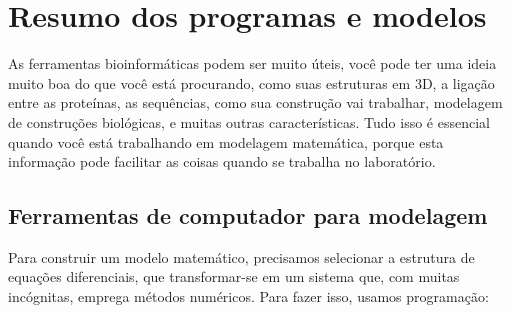 \documentclass[11pt, letterpaper, portuguese]{article}
\begin{document}
\newpage

\section{Resumo dos programas e modelos}
\par{As ferramentas bioinformáticas podem ser muito úteis, você pode ter uma ideia muito boa do que você está procurando, como suas estruturas em 3D, a ligação entre as proteínas, as sequências, como sua construção vai trabalhar, modelagem de construções biológicas, e muitas outras características. Tudo isso é essencial quando você está trabalhando em modelagem matemática, porque esta informação pode facilitar as coisas quando se trabalha no laboratório.
}
\subsection{Ferramentas de computador para modelagem}
\par{Para construir um modelo matemático, precisamos selecionar a estrutura de equações diferenciais, que transformar-se em um sistema que, com muitas incógnitas, emprega métodos numéricos. Para fazer isso, usamos programação:}
\end{document}
